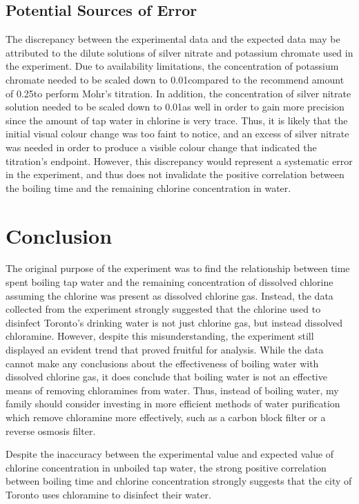 \documentclass[11pt]{article}
\begin{document}
\subsection{Potential Sources of Error}

The discrepancy between the experimental data and the expected data may be attributed to the dilute solutions of silver nitrate and potassium chromate used in the experiment. Due to availability limitations, the concentration of potassium chromate needed to be scaled down to 0.01\mpl compared to the recommend amount of 0.25\mpl to perform Mohr's titration. In addition, the concentration of silver nitrate solution needed to be scaled down to 0.01\mpl as well in order to gain more precision since the amount of tap water in chlorine is very trace. Thus, it is likely that the initial visual colour change was too faint to notice, and an excess of silver nitrate was needed in order to produce a visible colour change that indicated the titration's endpoint. However, this discrepancy would represent a systematic error in the experiment, and thus does not invalidate the positive correlation between the boiling time and the remaining chlorine concentration in water.

\section{Conclusion}

The original purpose of the experiment was to find the relationship between time spent boiling tap water and the remaining concentration of dissolved chlorine assuming the chlorine was present as dissolved chlorine gas. Instead, the data collected from the experiment strongly suggested that the chlorine used to disinfect Toronto's drinking water is not just chlorine gas, but instead dissolved chloramine. However, despite this misunderstanding, the experiment still displayed an evident trend that proved fruitful for analysis. While the data cannot make any conclusions about the effectiveness of boiling water with dissolved chlorine gas, it does conclude that boiling water is not an effective means of removing chloramines from water. Thus, instead of boiling water, my family should consider investing in more efficient methods of water purification which remove chloramine more effectively, such as a carbon block filter or a reverse osmosis filter.

Despite the inaccuracy between the experimental value and expected value of chlorine concentration in unboiled tap water, the strong positive correlation between boiling time and chlorine concentration strongly suggests that the city of Toronto uses chloramine to disinfect their water.
\end{document}

